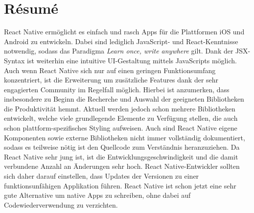 \section{Résumé}
React Native ermöglicht es einfach und rasch Apps für die Plattformen iOS und Android zu entwickeln. Dabei sind lediglich JavaScript- und React-Kenntnisse notwendig, sodass das Paradigma \textit{Learn once, write anywhere} gilt. Dank der JSX-Syntax ist weiterhin eine intuitive UI-Gestaltung mittels JavaScripts möglich. Auch wenn React Native sich nur auf einen geringen Funktionsumfang konzentriert, ist die Erweiterung um zusätzliche Features dank der sehr engagierten Community im Regelfall möglich. Hierbei ist anzumerken, dass insbesondere zu Beginn die Recherche und Auswahl der geeigneten Bibliotheken die Produktivität hemmt. Aktuell werden jedoch schon mehrere Bibliotheken entwickelt, welche viele grundlegende Elemente zu Verfügung stellen, die auch schon plattform-spezifisches Styling aufweisen. Auch sind React Native eigene Komponenten sowie externe Bibliotheken nicht immer vollständig dokumentiert, sodass es teilweise nötig ist den Quellcode zum Verständnis heranzuziehen. Da React Native sehr jung ist, ist die Entwicklungsgeschwindigkeit und die damit verbundene Anzahl an Änderungen sehr hoch. React Native-Entwickler sollten sich daher darauf einstellen, dass Updates der Versionen zu einer funktionsunfähigen Applikation führen. 
React Native ist schon jetzt eine sehr gute Alternative um native Apps zu schreiben, ohne dabei auf Codewiederverwendung zu verzichten.